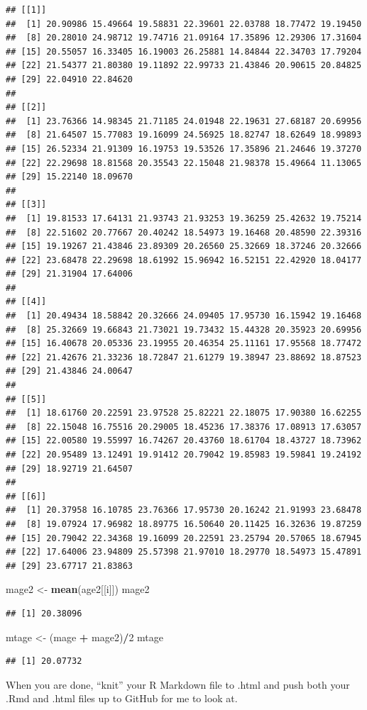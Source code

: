 \documentclass[]{article}
\newenvironment{Shaded}{\begin{snugshade}}{\end{snugshade}}
\newcommand{\KeywordTok}[1]{\textcolor[rgb]{0.13,0.29,0.53}{\textbf{#1}}}
\newcommand{\DecValTok}[1]{\textcolor[rgb]{0.00,0.00,0.81}{#1}}
\newcommand{\StringTok}[1]{\textcolor[rgb]{0.31,0.60,0.02}{#1}}
\newcommand{\OperatorTok}[1]{\textcolor[rgb]{0.81,0.36,0.00}{\textbf{#1}}}
\newcommand{\NormalTok}[1]{#1}
\begin{document}
\begin{verbatim}
## [[1]]
##  [1] 20.90986 15.49664 19.58831 22.39601 22.03788 18.77472 19.19450
##  [8] 20.28010 24.98712 19.74716 21.09164 17.35896 12.29306 17.31604
## [15] 20.55057 16.33405 16.19003 26.25881 14.84844 22.34703 17.79204
## [22] 21.54377 21.80380 19.11892 22.99733 21.43846 20.90615 20.84825
## [29] 22.04910 22.84620
## 
## [[2]]
##  [1] 23.76366 14.98345 21.71185 24.01948 22.19631 27.68187 20.69956
##  [8] 21.64507 15.77083 19.16099 24.56925 18.82747 18.62649 18.99893
## [15] 26.52334 21.91309 16.19753 19.53526 17.35896 21.24646 19.37270
## [22] 22.29698 18.81568 20.35543 22.15048 21.98378 15.49664 11.13065
## [29] 15.22140 18.09670
## 
## [[3]]
##  [1] 19.81533 17.64131 21.93743 21.93253 19.36259 25.42632 19.75214
##  [8] 22.51602 20.77667 20.40242 18.54973 19.16468 20.48590 22.39316
## [15] 19.19267 21.43846 23.89309 20.26560 25.32669 18.37246 20.32666
## [22] 23.68478 22.29698 18.61992 15.96942 16.52151 22.42920 18.04177
## [29] 21.31904 17.64006
## 
## [[4]]
##  [1] 20.49434 18.58842 20.32666 24.09405 17.95730 16.15942 19.16468
##  [8] 25.32669 19.66843 21.73021 19.73432 15.44328 20.35923 20.69956
## [15] 16.40678 20.05336 23.19955 20.46354 25.11161 17.95568 18.77472
## [22] 21.42676 21.33236 18.72847 21.61279 19.38947 23.88692 18.87523
## [29] 21.43846 24.00647
## 
## [[5]]
##  [1] 18.61760 20.22591 23.97528 25.82221 22.18075 17.90380 16.62255
##  [8] 22.15048 16.75516 20.29005 18.45236 17.38376 17.08913 17.63057
## [15] 22.00580 19.55997 16.74267 20.43760 18.61704 18.43727 18.73962
## [22] 20.95489 13.12491 19.91412 20.79042 19.85983 19.59841 19.24192
## [29] 18.92719 21.64507
## 
## [[6]]
##  [1] 20.37958 16.10785 23.76366 17.95730 20.16242 21.91993 23.68478
##  [8] 19.07924 17.96982 18.89775 16.50640 20.11425 16.32636 19.87259
## [15] 20.79042 22.34368 19.16099 20.22591 23.25794 20.57065 18.67945
## [22] 17.64006 23.94809 25.57398 21.97010 18.29770 18.54973 15.47891
## [29] 23.67717 21.83863
\end{verbatim}

\begin{Shaded}
\begin{Highlighting}[]
\NormalTok{mage2 <-}\StringTok{ }\KeywordTok{mean}\NormalTok{(age2[[i]])}
\NormalTok{mage2}
\end{Highlighting}
\end{Shaded}

\begin{verbatim}
## [1] 20.38096
\end{verbatim}

\begin{Shaded}
\begin{Highlighting}[]
\NormalTok{mtage <-}\StringTok{ }\NormalTok{(mage }\OperatorTok{+}\StringTok{ }\NormalTok{mage2)}\OperatorTok{/}\DecValTok{2}
\NormalTok{mtage}
\end{Highlighting}
\end{Shaded}

\begin{verbatim}
## [1] 20.07732
\end{verbatim}

When you are done, ``knit'' your R Markdown file to .html and push both
your .Rmd and .html files up to GitHub for me to look at.
\end{document}
